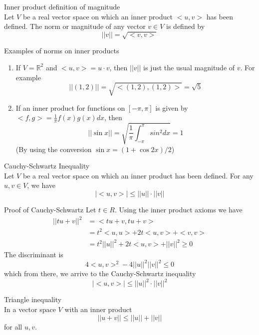 \documentclass[journal, letterpaper]{IEEEtran}
\begin{document}
    \begin{myboxr}{Inner product definition of magnitude} \\ 
        Let $V$ be a real vector space on which an inner product $<u, v>$ has been defined. The norm or magnitude of any vector $v \in V$ is defined by
        $$ ||v|| = \sqrt{<v, v>}$$
    \end{myboxr}
    \begin{myboxg}{Examples of norms on inner products}
        \begin{enumerate}
            \item If $V = \mathbb{R}^2$ and $<u, v> = u \cdot v$, then $||v||$ is just the usual magnitude of $v$. For example 
            $$ ||(1, 2)|| = \sqrt{<(1, 2), (1, 2)>} =\sqrt{5}$$
            \item If an inner product for functions on $[-\pi, \pi]$ is given by $<f, g> = \frac{1}{\pi} f(x)g(x)dx$, then
            $$||\sin x|| = \sqrt{\frac{1}{\pi}\int_{-\pi}^{\pi} sin^2 dx} = 1 $$
            (By using the conversion $\sin x = (1 + \cos 2x) / 2$)
        \end{enumerate}
    \end{myboxg}
    \begin{mybox}{Cauchy-Schwartz Inequality} \\ 
        Let $V$ be a real vector space on which an inner product has been defined. For any $u, v \in V$, we have
        $$ |<u, v>| \le ||u|| \cdot ||v||$$
    \end{mybox}
    \begin{myboxr}{Proof of Cauchy-Schwartz}
        Let $t \in R$. Using the inner product axioms we have
        \begin{align*}
            ||tu + v||^2 &= <tu + v, tu + v> \\
            &= t^2<u, u> + 2t<u, v> + <v, v> \\ 
            &= t^2||u||^2 + 2t<u, v> + ||v||^2 \ge 0
        \end{align*}
        The discriminant is
        $$ 4<u, v>^2 - 4||u||^2||v||^2 \le 0$$
        which from there, we arrive to the Cauchy-Schwartz inequality
        $$ |<u, v>| \le ||u||^2 \cdot ||v||^2$$
    \end{myboxr}
    \begin{mybox}{Triangle inequality} \\ 
        In a vector space $V$ with an inner product
        $$||u + v|| \le ||u|| + ||v||$$
        for all $u, v$.
    \end{mybox}
\end{document}
